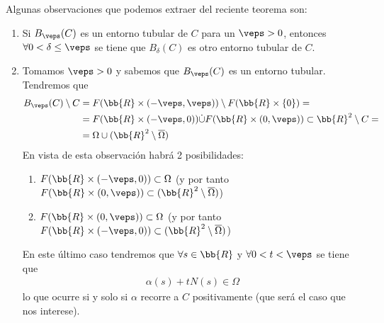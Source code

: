 \begin{observacion}
    Algunas observaciones que podemos extraer del reciente teorema son:
    \begin{enumerate}
        \item Si $B_\veps(C)$ es un entorno tubular de $C$ para un $\veps>0$, entonces $\forall 0<\delta \leq \veps$ se tiene que $B_\delta(C)$ es otro entorno tubular de $C$.
        
        \item Tomamos $\veps>0$ y sabemos que $B_\veps(C)$ es un entorno tubular. Tendremos que
        \begin{align*}
            B_\veps(C) \setminus C &= F(\bb{R}\times(-\veps, \veps)) \setminus F(\bb{R}\times\{0\})=\\
            &=F(\bb{R}\times(-\veps, 0))\dot{\cup}F(\bb{R}\times(0,\veps)) \subset \bb{R}^2 \setminus C =\\
            &= \Omega \cup (\bb{R}^2 \setminus \overline{\Omega})
        \end{align*}
        En vista de esta observación habrá 2 posibilidades:
        \begin{enumerate}
            \item $F(\bb{R}\times(-\veps, 0))\subset \Omega$ (y por tanto $F(\bb{R}\times(0,\veps))\subset (\bb{R}^2 \setminus \overline{\Omega})$)
            \item $F(\bb{R}\times(0,\veps))\subset \Omega$ (y por tanto $F(\bb{R}\times(-\veps, 0))\subset (\bb{R}^2 \setminus \overline{\Omega})$)
        \end{enumerate}
        En este último caso tendremos que $\forall s \in \bb{R}$ y $\forall 0<t<\veps$ se tiene que
        \begin{gather*}
            \alpha(s) + tN(s) \in \Omega
        \end{gather*}
        lo que ocurre si y solo si $\alpha$ recorre a $C$ positivamente (que será el caso que nos interese).
        \begin{figure}[H]
            \centering
            \begin{subfigure}[b]{0.35\linewidth}
                \centering
\end{subfigure}
\end{figure}
\end{enumerate}
\end{observacion}
